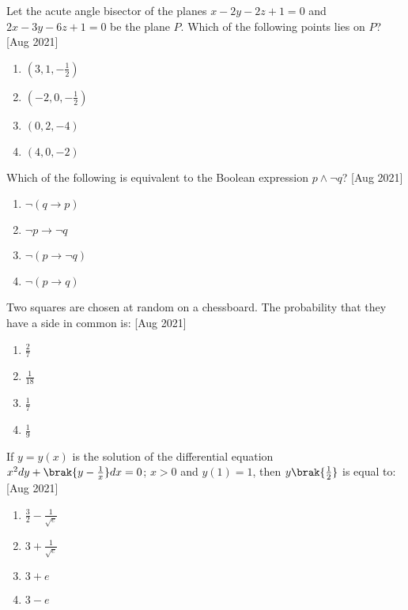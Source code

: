     \item Let the acute angle bisector of the planes $x - 2y - 2z + 1 = 0$ and $2x - 3y - 6z + 1 = 0$ be the plane $P$. Which of the following points lies on $P$? \hfill [Aug 2021]
    \begin{multicols}{2}
        \begin{enumerate}
            \item $(3, 1, -\frac{1}{2})$
            \item $(-2, 0, -\frac{1}{2})$
            \item $(0, 2, -4)$
            \item $(4, 0, -2)$
        \end{enumerate}
    \end{multicols}

    \item Which of the following is equivalent to the Boolean expression $p \land \neg q$? \hfill [Aug 2021]
    \begin{multicols}{4}
        \begin{enumerate}
            \item $\neg(q \to p)$
            \item $\neg p \to \neg q$
            \item $\neg(p \to \neg q)$
            \item $\neg(p \to q)$
        \end{enumerate}
    \end{multicols}
    
    \item Two squares are chosen at random on a chessboard. The probability that they have a side in common is: \hfill [Aug 2021]
    \begin{multicols}{4}
        \begin{enumerate}
            \item $\frac{2}{7}$
            \item $\frac{1}{18}$
            \item $\frac{1}{7}$
            \item $\frac{1}{9}$
        \end{enumerate}
    \end{multicols}

    \item If $y = y(x)$ is the solution of the differential equation $x^2 dy + \brak{y - \frac{1}{x}} dx = 0$; $x > 0$ and $y(1) = 1$, then $y\brak{\frac{1}{2}}$ is equal to: \hfill [Aug 2021]
    \begin{multicols}{4}
        \begin{enumerate}
            \item $\frac{3}{2} - \frac{1}{\sqrt{e}}$
            \item $3 + \frac{1}{\sqrt{e}}$
            \item $3 + e$
            \item $3 - e$
        \end{enumerate}
    \end{multicols}


